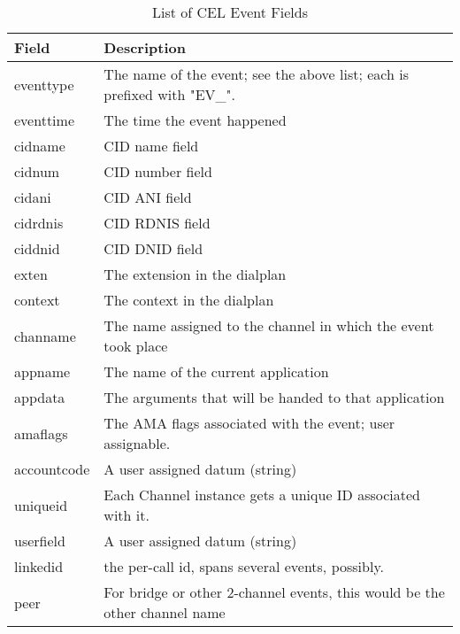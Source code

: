 \begin{table}[h]
  \begin{tabular}{ | l | p{10cm} | }
    \hline
    Field         & Description                                                                \\ \hline \hline
    eventtype     & The name of the event; see the above list; each is prefixed with "EV\_".   \\ \hline
    eventtime     & The time the event happened                                                \\ \hline
    cidname       & CID name field                                                             \\ \hline
    cidnum        & CID number field                                                           \\ \hline
    cidani        & CID ANI field                                                              \\ \hline
    cidrdnis      & CID RDNIS field                                                            \\ \hline
    ciddnid       & CID DNID field                                                             \\ \hline
    exten         & The extension in the dialplan                                              \\ \hline
    context       & The context in the dialplan                                                \\ \hline
    channame      & The name assigned to the channel in which the event took place             \\ \hline
    appname       & The name of the current application                                        \\ \hline
    appdata       & The arguments that will be handed to that application                      \\ \hline
    amaflags      & The AMA flags associated with the event; user assignable.                  \\ \hline
    accountcode   & A user assigned datum (string)                                             \\ \hline
    uniqueid      & Each Channel instance gets a unique ID associated with it.                 \\ \hline
    userfield     & A user assigned datum (string)                                             \\ \hline
    linkedid      & the per-call id, spans several events, possibly.                           \\ \hline
    peer          & For bridge or other 2-channel events, this would be the other channel name \\
    \hline
  \end{tabular}
  \caption{List of CEL Event Fields}
  \label{field_table}
\end{table}

